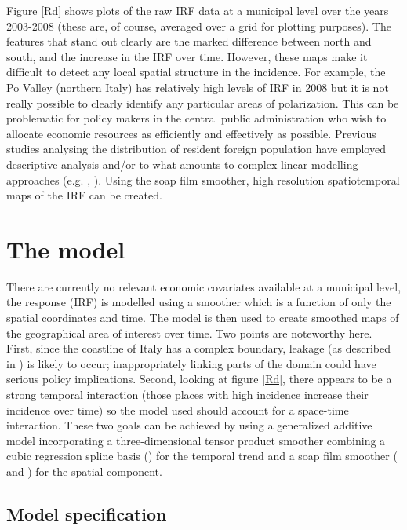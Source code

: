 Figure \ref{Rd} shows plots of the raw IRF data at a municipal level over the years 2003-2008 (these are, of course, averaged over a grid for plotting purposes). The features that stand out clearly are the marked difference between north and south, and the increase in the IRF over time. However, these maps make it difficult to detect any local spatial structure in the incidence. For example, the Po Valley (northern Italy) has relatively high levels of IRF in 2008 but it is not really possible to clearly identify any particular areas of polarization. This can be problematic for policy makers in the central public administration who wish to allocate economic resources as efficiently and effectively as possible. Previous studies analysing the distribution of resident foreign population have employed descriptive analysis and/or to what amounts  to complex linear modelling approaches (e.g. \cite{Fonseca2008}, \cite{Longhi2010}). Using the soap \label{cor-r18} film smoother, high resolution spatiotemporal maps of the IRF can be created.


\section{The model \label{METH}}

There are currently no relevant economic covariates available at a municipal level, the response (IRF) is modelled using a smoother which is a function of only the spatial coordinates and time. The model is then used to create smoothed maps of the geographical area of interest over time. Two points are noteworthy here. First, since the coastline of Italy has a complex boundary, leakage (as described in ) is likely to occur; inappropriately linking parts of the domain could have serious policy implications. Second, looking at figure \ref{Rd}, there appears to be a strong temporal interaction (those places with high incidence increase their incidence over time) so the model used should account for a space-time interaction. These two goals can be achieved by using a generalized additive model incorporating a three-dimensional tensor product smoother combining a cubic regression spline basis () for the temporal trend and a soap film smoother (\cite{soap} and ) for the spatial component.

\subsection{Model specification \label{MS}}

